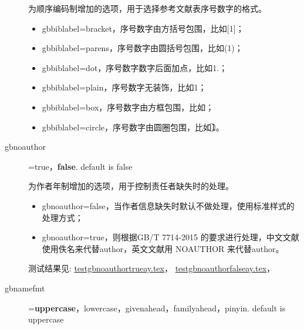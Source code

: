 \begin{description}
  为顺序编码制增加的选项，用于选择参考文献表序号数字的格式。
  \begin{itemize}
    \item gbbiblabel=bracket，序号数字由方括号包围，比如[1]；
    \item gbbiblabel=parens，序号数字由圆括号包围，比如(1)；
    \item gbbiblabel=dot，序号数字数字后面加点，比如1.；
    \item gbbiblabel=plain，序号数字无装饰，比如1；
    \item gbbiblabel=box，序号数字由方框包围，比如；
    \item gbbiblabel=circle，序号数字由圆圈包围，比如\textcircled{1}。
  \end{itemize}

  \item[gbnoauthor]=true，\textbf{false}. \hfill default is false

  为作者年制增加的选项，用于控制责任者缺失时的处理。
  \begin{itemize}
    \item gbnoauthor=false，当作者信息缺失时默认不做处理，使用标准样式的处理方式；
    \item gbnoauthor=true，则根据GB/T 7714-2015 的要求进行处理，中文文献使用佚名来代替author，英文文献用 NOAUTHOR 来代替author。
  \end{itemize}
  测试结果见:
  \href{run:./example/testgbnoauthortrueay.tex}{testgbnoauthortrueay.tex}，
  \href{run:./example/testgbnoauthorfalseay.tex}{testgbnoauthorfalseay.tex}，

  \item[gbnamefmt]=\textbf{uppercase}，lowercase，givenahead，familyahead，pinyin. \hfill default is uppercase


\end{description}

